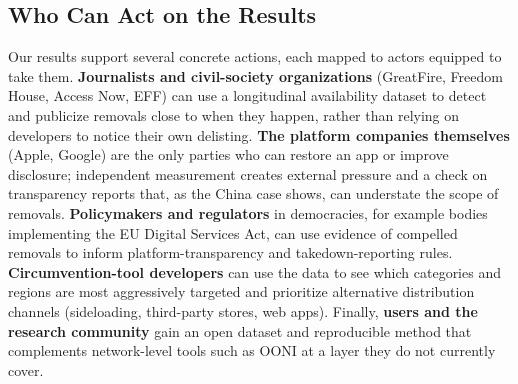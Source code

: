 \subsection{Who Can Act on the Results}

Our results support several concrete actions, each mapped to actors equipped to
take them. \textbf{Journalists and civil-society organizations} (GreatFire,
Freedom House, Access Now, EFF) can use a longitudinal availability dataset to
detect and publicize removals close to when they happen, rather than relying on
developers to notice their own delisting. \textbf{The platform companies
themselves} (Apple, Google) are the only parties who can restore an app or
improve disclosure; independent measurement creates external pressure and a check
on transparency reports that, as the China case shows, can understate the scope
of removals. \textbf{Policymakers and regulators} in democracies, for example
bodies implementing the EU Digital Services Act, can use evidence of compelled
removals to inform platform-transparency and takedown-reporting rules.
\textbf{Circumvention-tool developers} can use the data to see which categories
and regions are most aggressively targeted and prioritize alternative
distribution channels (sideloading, third-party stores, web apps). Finally,
\textbf{users and the research community} gain an open dataset and reproducible
method that complements network-level tools such as OONI at a layer they do not
currently cover.
